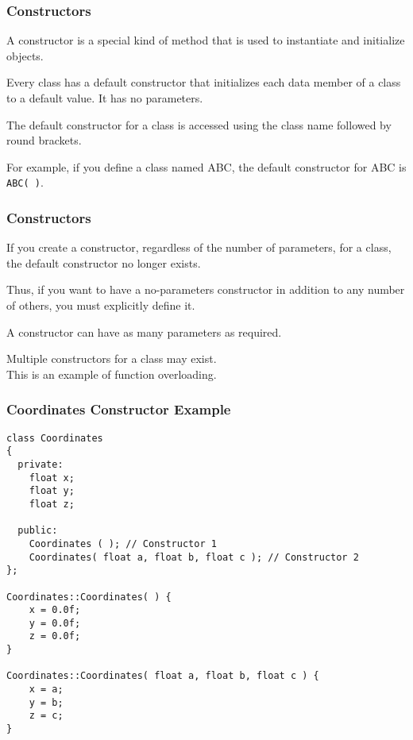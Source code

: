 \begin{frame}
\frametitle{Constructors}

A \alert{constructor} is a special kind of method that is used to instantiate and initialize objects.

Every class has a default constructor that initializes each data member of a class to a default value. It has no parameters.

The default constructor for a class is accessed using the class name followed by round brackets.

For example, if you define a class named ABC, the default constructor for ABC is \texttt{ABC( )}.

\end{frame}

\begin{frame}
\frametitle{Constructors}

If you create a constructor, regardless of the number of parameters, for a class, the default constructor no longer exists.

Thus, if you want to have a no-parameters constructor in addition to any number of others, you must explicitly define it.

A constructor can have as many parameters as required.

Multiple constructors for a class may exist.\\
\quad This is an example of function overloading.

\end{frame}

\begin{frame}[fragile]
\frametitle{Coordinates Constructor Example}

{\scriptsize
\begin{verbatim}
class Coordinates
{
  private:
    float x;
    float y;
    float z;
    
  public:
    Coordinates ( ); // Constructor 1
    Coordinates( float a, float b, float c ); // Constructor 2
};

Coordinates::Coordinates( ) {
    x = 0.0f; 
    y = 0.0f;
    z = 0.0f;
}

Coordinates::Coordinates( float a, float b, float c ) {
    x = a;
    y = b;
    z = c;
}    

\end{verbatim}
}
\end{frame}

